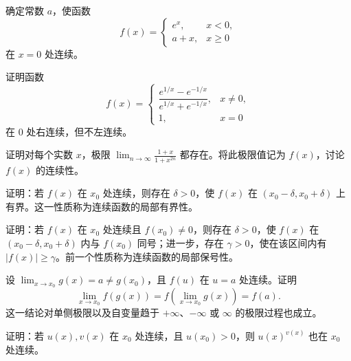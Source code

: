 \newpage
\noindent\begin{minipage}{\textwidth}
确定常数 $a$，使函数\[f(x)=\begin{cases}e^x,&x<0,\\a+x,&x\ge0\end{cases}\]在 $x=0$ 处连续。
\end{minipage}\par\vfill
\noindent\begin{minipage}{\textwidth}
证明函数\[f(x)=\begin{cases}\dfrac{e^{1/x}-e^{-1/x}}{e^{1/x}+e^{-1/x}},&x\ne0,\\1,&x=0\end{cases}\]在 $0$ 处右连续，但不左连续。
\end{minipage}\par\vfill
\noindent\begin{minipage}{\textwidth}
证明对每个实数 $x$，极限 $\displaystyle\lim_{n\to\infty}\frac{1+x}{1+x^{2n}}$ 都存在。将此极限值记为 $f(x)$，讨论 $f(x)$ 的连续性。
\end{minipage}\par\vfill
\noindent\begin{minipage}{\textwidth}
证明：若 $f(x)$ 在 $x_0$ 处连续，则存在 $\delta>0$，使 $f(x)$ 在 $(x_0-\delta,x_0+\delta)$ 上有界。这一性质称为连续函数的局部有界性。
\end{minipage}\par\vfill
\newpage
\noindent\begin{minipage}{\textwidth}
证明：若 $f(x)$ 在 $x_0$ 处连续且 $f(x_0)\ne0$，则存在 $\delta>0$，使 $f(x)$ 在 $(x_0-\delta,x_0+\delta)$ 内与 $f(x_0)$ 同号；进一步，存在 $\gamma>0$，使在该区间内有 $|f(x)|\ge\gamma$。前一个性质称为连续函数的局部保号性。
\end{minipage}\par\vfill
\noindent\begin{minipage}{\textwidth}
设 $\displaystyle\lim_{x\to x_0}g(x)=a\ne g(x_0)$，且 $f(u)$ 在 $u=a$ 处连续。证明\[\lim_{x\to x_0}f(g(x))=f\!\left(\lim_{x\to x_0}g(x)\right)=f(a).\]这一结论对单侧极限以及自变量趋于 $+\infty$、$-\infty$ 或 $\infty$ 的极限过程也成立。
\end{minipage}\par\vfill
\noindent\begin{minipage}{\textwidth}
证明：若 $u(x),v(x)$ 在 $x_0$ 处连续，且 $u(x_0)>0$，则 $u(x)^{v(x)}$ 也在 $x_0$ 处连续。
\end{minipage}\par\vfill
